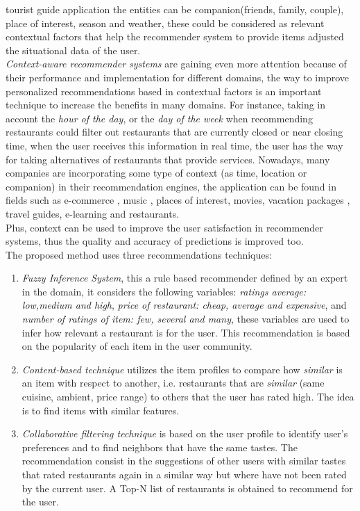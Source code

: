 tourist guide application the entities can be companion(friends,
family, couple), place of interest, season and weather, these could be
considered as relevant contextual factors that help the recommender
system to provide items adjusted the situational data of the user.\\
\textit{Context-aware recommender systems} are gaining even more
attention because of their performance and implementation for
different domains, the  way to improve personalized recommendations
based in contextual factors is an important technique to increase the
benefits in  many domains. For instance, taking in account the
\textit{hour of the day},  or the \textit{day of the week} when
recommending restaurants could  filter out restaurants that are
currently closed or near closing time, when the user receives this
information in real time, the user has the  way for taking
alternatives of restaurants that provide services. Nowadays, many
companies are incorporating some type of context (as time, location or
companion) in their recommendation engines, the application can be
found in fields such as e-commerce\cite{schafer1999recommender}
\cite{bulander2005enabling}, music\cite{ricci2012context} 
\cite{baltrunas2011incarmusic} \cite{huq2010automated},
places of interest\cite{baltrunas2012context},
movies\cite{eyjolfsdottir2010moviegen}, vacation
packages\cite{liu2011personalized} \cite{liu2014cocktail}, 
travel guides\cite{savage2012m}, e-learning\cite{ortigosa2010entornos} 
and restaurants\cite{chu2013chinese}.\\
Plus, context can be used to improve the user satisfaction  in
recommender systems, thus the quality and accuracy of predictions  
is improved too. \\
The proposed method uses three recommendations techniques:
\begin{enumerate} 
\item \textit{Fuzzy Inference System}, this a rule based recommender
defined by an expert in the domain, it considers the following
variables: \textit{ratings average: low,medium and high},
\textit{price of restaurant: cheap, average and expensive}, and
\textit{number of ratings of item: few, several and many}, these
variables are used to infer how relevant a restaurant is for the user.
This recommendation is based on the popularity of each item in the
user community.
\item \textit{Content-based technique} utilizes the item profiles 
to compare how \textit{similar} is an item with respect to 
another, i.e. restaurants that are \textit{similar} (same cuisine, 
ambient, price range) to others that the user has rated high. 
The idea is to find items with similar features. 
\item \textit{Collaborative filtering technique} is based on the user
profile to identify user's preferences and to find neighbors that
have the same tastes. The recommendation consist in the suggestions of
other users with similar tastes that rated restaurants again in a
similar way but where have not been rated by the current user. A Top-N
list of restaurants is obtained to recommend for the user.
\end{enumerate} 
